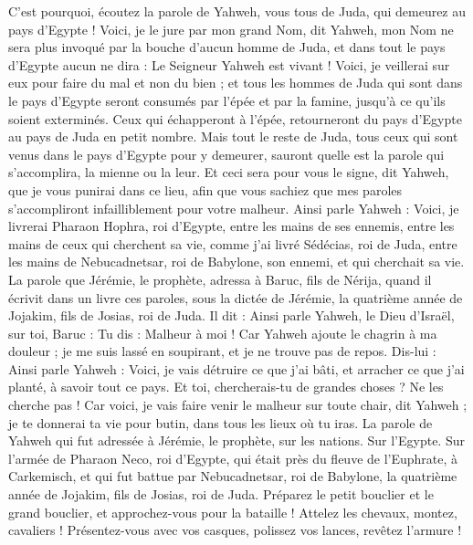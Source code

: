 \begin{multicols}{2}
C'est pourquoi, écoutez la parole de Yahweh, vous tous de Juda, qui demeurez au pays d'Egypte ! Voici, je le jure par mon grand Nom, dit Yahweh, mon Nom ne sera plus invoqué par la bouche d'aucun homme de Juda, et dans tout le pays d'Egypte aucun ne dira : Le Seigneur Yahweh est vivant !
Voici, je veillerai sur eux pour faire du mal et non du bien ; et tous les hommes de Juda qui sont dans le pays d'Egypte seront consumés par l'épée et par la famine, jusqu'à ce qu'ils soient exterminés.
Ceux qui échapperont à l'épée, retourneront du pays d'Egypte au pays de Juda en petit nombre. Mais tout le reste de Juda, tous ceux qui sont venus dans le pays d'Egypte pour y demeurer, sauront quelle est la parole qui s'accomplira, la mienne ou la leur.
Et ceci sera pour vous le signe, dit Yahweh, que je vous punirai dans ce lieu, afin que vous sachiez que mes paroles s'accompliront infailliblement pour votre malheur.
Ainsi parle Yahweh : Voici, je livrerai Pharaon Hophra, roi d'Egypte, entre les mains de ses ennemis, entre les mains de ceux qui cherchent sa vie, comme j'ai livré Sédécias, roi de Juda, entre les mains de Nebucadnetsar, roi de Babylone, son ennemi, et qui cherchait sa vie.
\VerseOne{}La parole que Jérémie, le prophète, adressa à Baruc, fils de Nérija, quand il écrivit dans un livre ces paroles, sous la dictée de Jérémie, la quatrième année de Jojakim, fils de Josias, roi de Juda. Il dit :
Ainsi parle Yahweh, le Dieu d'Israël, sur toi, Baruc :
Tu dis : Malheur à moi ! Car Yahweh ajoute le chagrin à ma douleur ; je me suis lassé en soupirant, et je ne trouve pas de repos.
Dis-lui : Ainsi parle Yahweh : Voici, je vais détruire ce que j'ai bâti, et arracher ce que j'ai planté, à savoir tout ce pays.
Et toi, chercherais-tu de grandes choses ? Ne les cherche pas ! Car voici, je vais faire venir le malheur sur toute chair, dit Yahweh ; je te donnerai ta vie pour butin, dans tous les lieux où tu iras.
\VerseOne{}La parole de Yahweh qui fut adressée à Jérémie, le prophète, sur les nations.
Sur l'Egypte. Sur l'armée de Pharaon Neco, roi d'Egypte, qui était près du fleuve de l'Euphrate, à Carkemisch, et qui fut battue par Nebucadnetsar, roi de Babylone, la quatrième année de Jojakim, fils de Josias, roi de Juda.
Préparez le petit bouclier et le grand bouclier, et approchez-vous pour la bataille !
Attelez les chevaux, montez, cavaliers ! Présentez-vous avec vos casques, polissez vos lances, revêtez l'armure !

\end{multicols}
